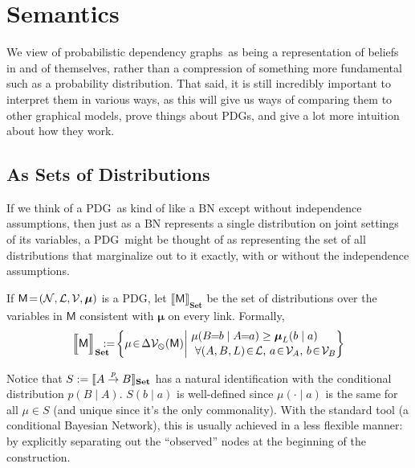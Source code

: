 \documentclass{article}
\newcommand\Set{\textbf{Set}}
\newcommand{\none}{\varobslash}
\def\sheq{\!=\!}
\newcommand{\V}{\mathcal V}
\newcommand{\sfM}{\mathsf M}
\newcommand{\modelname}{probabilistic dependency graph}
\newcommand{\modelnames}{\modelname s}
\newcommand{\MN}{PDG}
\newcommand{\MNs}{\MN s}
\begin{document}
			
	\section{Semantics}\label{sec:semantics}
	We view of \modelnames\ as being a representation of beliefs in and of themselves, rather than a compression of something more fundamental such as a probability distribution. That said, it is still incredibly important to interpret them in various ways, as this will give us ways of comparing them to other graphical models, prove things about \MNs, and give a lot more intuition about how they work.
	
	\subsection{As Sets of Distributions}\label{sec:set-of-distribution-semantics}
	If we think of a \MN\ as kind of like a BN except without independence assumptions, then just as a BN represents a single distribution on joint settings of its variables, a \MN\ might be thought of as representing the set of all distributions that marginalize out to it exactly, with or without the independence assumptions.

	\begin{defn} \label{def:set-semantics}
		If $\sfM\sheq\mnvars[]$ is a \MN, let $\llbracket \sfM \rrbracket_\Set$ be the set of distributions over the variables in $\sfM$ consistent with $\boldsymbol\mu$ on every link. Formally,		
		\[ \Big\llbracket \sfM \Big\rrbracket_\Set \hspace{-2ex} := \!\left\{\mu \!\in\! \Delta \V_\none (\sfM) \middle|\!
		\begin{array}{l}
		\mu(B\!\! =\!\!b \mid A\!\!=\!\!a) \geq \boldsymbol\mu_L(b \mid a) \\[0.1em]
		~\text{$\forall (A, B, L) \!\in\! \mathcal L$, $a \!\in\!\mathcal V_A$, $b \!\in\! \mathcal V_B$} \end{array}\!\!\! \right\}\]
	\end{defn}

	\begin{example}
		Notice that $S := \bbr{
			A \overset{p}{\to} B
		}_\Set$ has a natural identification with 
		the conditional distribution $p( B \mid A)$. $S(b\mid a)$ is well-defined since $\mu(\cdot\mid a)$ is the same for all $\mu \in S$ (and unique since it's the only commonality). With the standard tool (a conditional Bayesian Network), this is usually achieved in a less flexible manner: by explicitly separating out the ``observed'' nodes at the beginning of the construction.
	\end{example}
	
\end{document}
